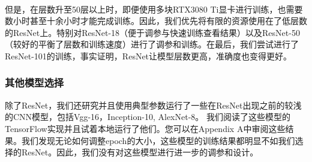 \documentclass{article}
\theoremstyle{definition}
\begin{document}
\\
\indent
但是，在层数升至50层以上时，即便使用多块RTX3080 Ti显卡进行训练，也需要数小时甚至十余小时才能完成训练。因此，我们优先将有限的资源使用在了低层数的ResNet上。特别对ResNet-18（便于调参与快速训练查看结果）以及ResNet-50（较好的平衡了层数和训练速度）进行了调参和训练。在最后，我们尝试进行了ResNet-101的训练，事实证明，ResNet让模型层数更高，准确度也变得更好。
\\
\indent

\subsubsection{其他模型选择}
除了ResNet，我们还研究并且使用典型参数运行了一些在ResNet出现之前的较浅的CNN模型，包括Vgg-16，Inception-10, AlexNet-8。 我们阅读了这些模型的TensorFlow实现并且试着本地运行了他们。您可以在Appendix A中审阅这些结果。我们发现无论如何调整epoch的大小，这些模型的训练结果都明显不如我们选择的ResNet。因此，我们没有对这些模型进行进一步的调参和设计。
\end{document}
